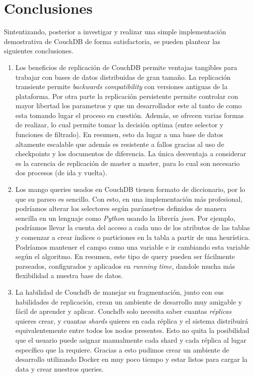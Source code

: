 \documentclass{article}
\begin{document}
    \section{Conclusiones}
        Sintentizando, posterior a investigar y realizar una simple implementación demostrativa de CouchDB de forma satisfactoria, se pueden plantear las siguientes conclusiones.
        \begin{enumerate}
            \item Los beneficios de replicación de CouchDB permite ventajas tangibles para trabajar con bases de datos distribuidas de gran tamaño. La replicación transiente permite \textit{backwards compatibility} con versiones antiguas de la plataforma. Por otra parte la replicación persistente permite controlar con mayor libertad los parametros y que un desarrollador este al tanto de como esta tomando lugar el proceso en cuestión. Además, se ofrecen varias formas de realizar, lo cual permite tomar la decisión optima (entre selector y funciones de filtrado). En resumen, esto da lugar a una base de datos altamente escalable que además es resistente a fallos gracias al uso de checkpoints y los documentos de diferencia. La única desventaja a considerar es la carencia de replicación de master a master, para lo cual son necesario dos procesos (de ida y vuelta).
            \item Los mango queries usados en CouchDB tienen formato de diccionario, por lo que su parseo es sencillo. Con esto, en una implementación más profesional, podríamos alterar los selectores según parámetros definidos de manera sencilla en un lenguaje como \textit{Python} usando la librería \textit{json}. Por ejemplo, podríamos llevar la cuenta del acceso a cada uno de los atributos de las tablas y comenzar a crear índices o particiones en la tabla a partir de una heurística. Podríamos mantener el campo como una variable e ir cambiando esta variable según el algoritmo. En resumen, este tipo de query pueden ser fácilmente parseados, configurados y aplicados en \textit{running time}, dandole mucha más flexibilidad a nuestra base de datos.
			\item La habilidad de Couchdb de manejar su fragmentación, junto con sus habilidades de replicación, crean un ambiente de desarrollo muy amigable y fácil de aprender y aplicar. Couchdb solo necesita saber cuantas \textit{réplicas} quieres crear, y cuantas \textit{shards} quieres en cada réplica y el sistema distribuirá equivalentemente entre todos los nodos presentes. Esto no quita la posibilidad que el usuario puede asignar manualmente cada shard y cada réplica al lugar específico que la requiere. Gracias a esto pudimos crear un ambiente de desarrollo utilizando Docker en muy poco tiempo y estar listos para cargar la data y crear nuestros queries.
        \end{enumerate}
    \newpage

    
    
\end{document}

